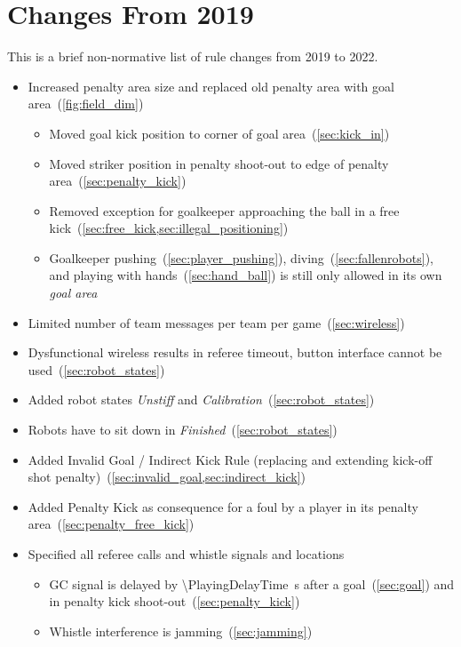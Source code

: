 \section{Changes From 2019}
This is a brief non-normative list of rule changes from 2019 to 2022.

\begin{itemize}
    \item Increased penalty area size and replaced old penalty area with goal area~(\cref{fig:field_dim})
    \begin{itemize}
        \item Moved goal kick position to corner of goal area~(\cref{sec:kick_in})
        \item Moved striker position in penalty shoot-out to edge of penalty area~(\cref{sec:penalty_kick})
        \item Removed exception for goalkeeper approaching the ball in a free kick~(\cref{sec:free_kick,sec:illegal_positioning})
        \item Goalkeeper pushing~(\cref{sec:player_pushing}), diving~(\cref{sec:fallenrobots}), and playing with hands~(\cref{sec:hand_ball}) is still only allowed in its own \emph{goal area}
    \end{itemize}
    \item Limited number of team messages per team per game~(\cref{sec:wireless})
    \item Dysfunctional wireless results in referee timeout, button interface cannot be used~(\cref{sec:robot_states})
    \item Added robot states \emph{Unstiff} and \emph{Calibration}~(\cref{sec:robot_states})
    \item Robots have to sit down in \emph{Finished}~(\cref{sec:robot_states})
    \item Added Invalid Goal / Indirect Kick Rule (replacing and extending kick-off shot penalty)~(\cref{sec:invalid_goal,sec:indirect_kick})
    \item Added Penalty Kick as consequence for a foul by a player in its penalty area~(\cref{sec:penalty_free_kick})
    \item Specified all referee calls and whistle signals and locations
    \begin{itemize}
        \item GC signal is delayed by \qty{\PlayingDelayTime}{\second} after a goal~(\cref{sec:goal}) and in penalty kick shoot-out~(\cref{sec:penalty_kick})
        \item Whistle interference is jamming~(\cref{sec:jamming})

\end{itemize}
\end{itemize}
